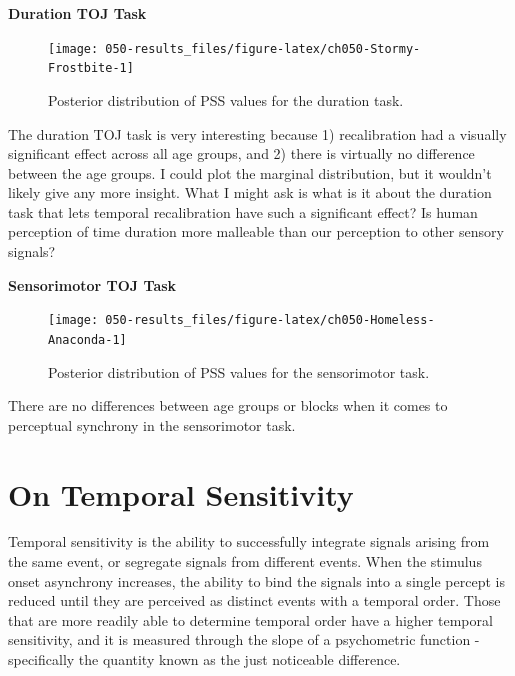 \documentclass[11pt, oneside, openany]{scrbook}
\begin{document}
\textbf{Duration TOJ Task}

\begin{figure}

{\centering \texttt{[image: 050-results\_files/figure-latex/ch050-Stormy-Frostbite-1]} 

}

\caption{Posterior distribution of PSS values for the duration task.}\label{fig:ch050-Stormy-Frostbite}
\end{figure}

The duration TOJ task is very interesting because 1) recalibration had a visually significant effect across all age groups, and 2) there is virtually no difference between the age groups. I could plot the marginal distribution, but it wouldn't likely give any more insight. What I might ask is what is it about the duration task that lets temporal recalibration have such a significant effect? Is human perception of time duration more malleable than our perception to other sensory signals?

\textbf{Sensorimotor TOJ Task}

\begin{figure}

{\centering \texttt{[image: 050-results\_files/figure-latex/ch050-Homeless-Anaconda-1]} 

}

\caption{Posterior distribution of PSS values for the sensorimotor task.}\label{fig:ch050-Homeless-Anaconda}
\end{figure}

There are no differences between age groups or blocks when it comes to perceptual synchrony in the sensorimotor task.

\hypertarget{on-temporal-sensitivity}{%
\section{On Temporal Sensitivity}\label{on-temporal-sensitivity}}

Temporal sensitivity is the ability to successfully integrate signals arising from the same event, or segregate signals from different events. When the stimulus onset asynchrony increases, the ability to bind the signals into a single percept is reduced until they are perceived as distinct events with a temporal order. Those that are more readily able to determine temporal order have a higher temporal sensitivity, and it is measured through the slope of a psychometric function - specifically the quantity known as the just noticeable difference.
\end{document}
